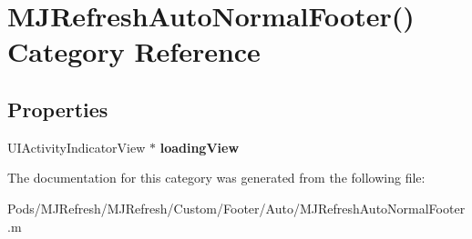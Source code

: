 \hypertarget{category_m_j_refresh_auto_normal_footer_07_08}{}\section{M\+J\+Refresh\+Auto\+Normal\+Footer() Category Reference}
\label{category_m_j_refresh_auto_normal_footer_07_08}
\subsection*{Properties}
\begin{DoxyCompactItemize}
\item 
\mbox{\label{category_m_j_refresh_auto_normal_footer_07_08_ae5c9a07fb2db90dbb9004b9942298512}} 
U\+I\+Activity\+Indicator\+View $\ast$ {\bfseries loading\+View}
\end{DoxyCompactItemize}


The documentation for this category was generated from the following file\+:\begin{DoxyCompactItemize}
\item 
Pods/\+M\+J\+Refresh/\+M\+J\+Refresh/\+Custom/\+Footer/\+Auto/M\+J\+Refresh\+Auto\+Normal\+Footer.\+m\end{DoxyCompactItemize}
